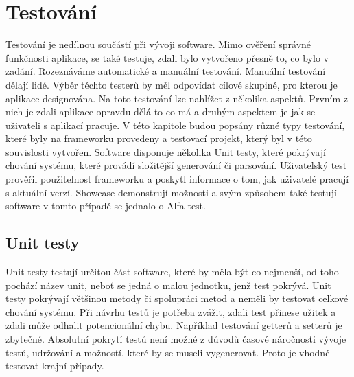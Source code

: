 \chapter{Testování}
Testování je nedílnou součástí při vývoji software. Mimo ověření správné funkčnosti aplikace, se také testuje, zdali bylo vytvořeno přesně to, co bylo v zadání. Rozeznáváme automatické a manuální testování. Manuální testování dělají lidé. Výběr těchto testerů by měl odpovídat cílové skupině, pro kterou je aplikace designována. Na toto testování lze nahlížet z několika aspektů. Prvním z nich je zdali aplikace opravdu dělá to co má a druhým aspektem je jak se uživateli s aplikací pracuje. V této kapitole budou popsány různé typy testování, které byly na frameworku provedeny a testovací projekt, který byl v této souvislosti vytvořen. Software disponuje několika Unit testy, které pokrývají chování systému, které provádí složitější generování či parsování. Uživatelský test prověřil použitelnost frameworku a poskytl informace o tom, jak uživatelé pracují s aktuální verzí. Showcase demonstrují možnosti a svým způsobem také testují software v tomto případě se jednalo o Alfa test.

\section{Unit testy}
Unit testy testují určitou část software, které by měla být co nejmenší, od toho pochází název unit, neboť se jedná o malou jednotku, jenž test pokrývá. Unit testy pokrývají většinou  metody či spolupráci metod a neměli by testovat celkové chování systému. Při návrhu testů je potřeba zvážit, zdali test přinese užitek a zdali může odhalit potencionální chybu. Například testování getterů a setterů je zbytečné. Absolutní pokrytí testů není možné z důvodů časové náročnosti vývoje testů, udržování a možností, které by se museli vygenerovat. Proto je vhodné testovat krajní případy. 

